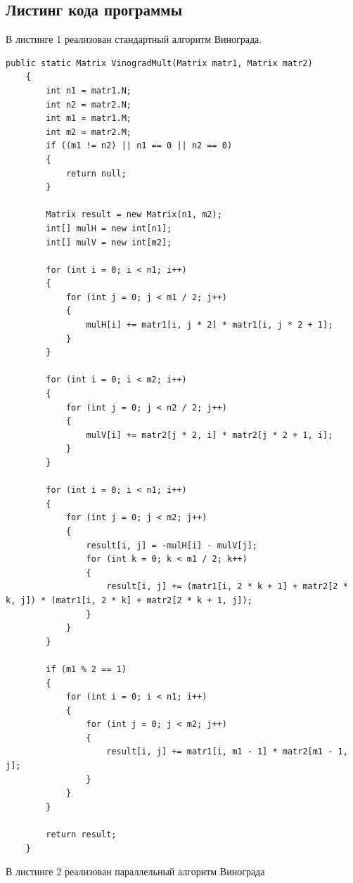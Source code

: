 \documentclass[14pt, a4paper]{extarticle}
\begin{document}
\subsection{Листинг кода программы}
В листинге 1 реализован стандартный алгоритм Винограда.
\begin{lstlisting}[label=MultMatrVin, caption=Стандартный алгоритм Винограда]
	public static Matrix VinogradMult(Matrix matr1, Matrix matr2)
	{
		int n1 = matr1.N;
		int n2 = matr2.N;
		int m1 = matr1.M;
		int m2 = matr2.M;
		if ((m1 != n2) || n1 == 0 || n2 == 0)
		{
			return null;
		}
		
		Matrix result = new Matrix(n1, m2);
		int[] mulH = new int[n1];
		int[] mulV = new int[m2];
		
		for (int i = 0; i < n1; i++)
		{
			for (int j = 0; j < m1 / 2; j++)
			{
				mulH[i] += matr1[i, j * 2] * matr1[i, j * 2 + 1];
			}
		}
		
		for (int i = 0; i < m2; i++)
		{
			for (int j = 0; j < n2 / 2; j++)
			{
				mulV[i] += matr2[j * 2, i] * matr2[j * 2 + 1, i];
			}
		}
		
		for (int i = 0; i < n1; i++)
		{
			for (int j = 0; j < m2; j++)
			{
				result[i, j] = -mulH[i] - mulV[j];
				for (int k = 0; k < m1 / 2; k++)
				{
					result[i, j] += (matr1[i, 2 * k + 1] + matr2[2 * k, j]) * (matr1[i, 2 * k] + matr2[2 * k + 1, j]);
				}
			}
		}
		
		if (m1 % 2 == 1)
		{
			for (int i = 0; i < n1; i++)
			{
				for (int j = 0; j < m2; j++)
				{
					result[i, j] += matr1[i, m1 - 1] * matr2[m1 - 1, j];
				}
			}
		}
		
		return result;
	}
\end{lstlisting}
В листинге 2 реализован параллельный алгоритм Винограда
\end{document}
